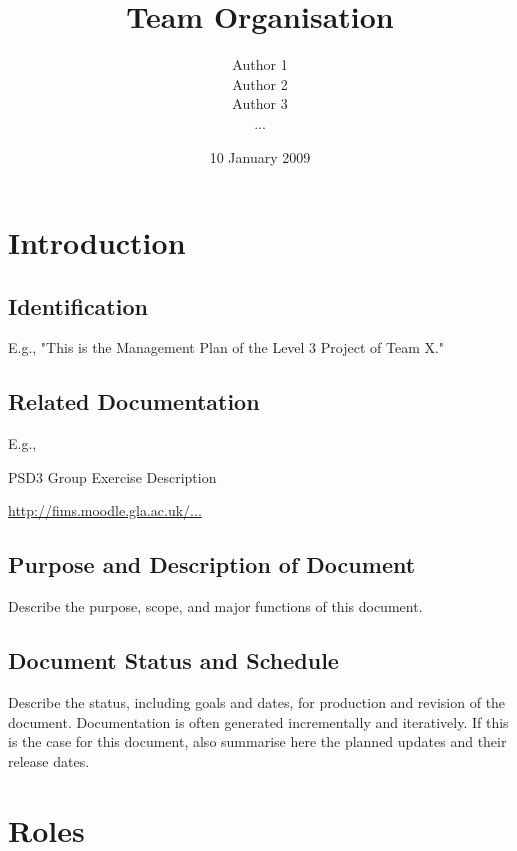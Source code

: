\documentclass{l3deliverable}
\title{Team Organisation}
\author{
  Author 1 \\
  Author 2 \\
  Author 3 \\
  ...}
\date{10 January 2009}
\begin{document}

\maketitle


\section{Introduction}

\subsection{Identification}

E.g., "This is the Management Plan of the Level 3 Project of Team X."

\subsection{Related Documentation}

E.g.,
\begin{list}{}{}
\item PSD3 Group Exercise Description \
  
  \url{http://fims.moodle.gla.ac.uk/...}
\end{list}
 

\subsection{Purpose and Description of Document}
Describe the purpose, scope, and major functions of this document.

\subsection{Document Status and Schedule}

Describe the status, including goals and dates, for production and
revision of the document.  Documentation is often generated
incrementally and iteratively. If this is the case for this document,
also summarise here the planned updates and their release dates.


\section{Roles}
\end{document}
